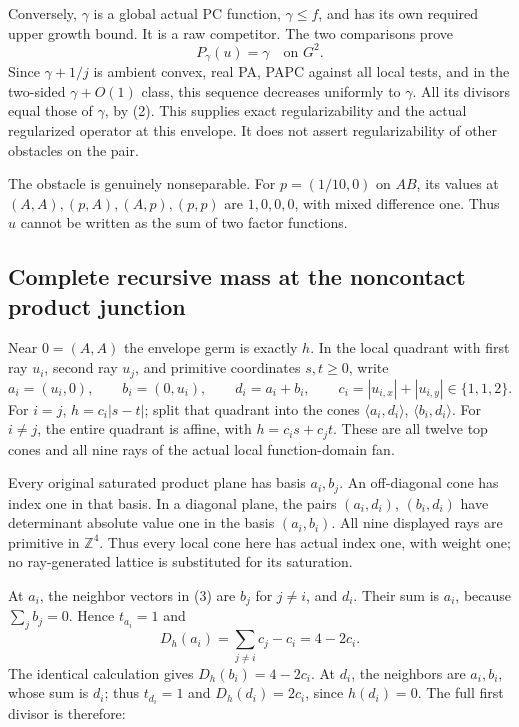 \documentclass[
  10pt,
]{article}
\begin{document}
Conversely, \(\gamma\) is a global actual PC function, \(\gamma\leq f\),
and has its own required upper growth bound. It is a raw competitor. The
two comparisons prove \[
                              P_\gamma(u)=\gamma\quad\text{on }G^2.
 \tag{10}
\] Since \(\gamma+1/j\) is ambient convex, real PA, PAPC against all
local tests, and in the two-sided \(\gamma+O(1)\) class, this sequence
decreases uniformly to \(\gamma\). All its divisors equal those of
\(\gamma\), by (2). This supplies exact regularizability and the actual
regularized operator at this envelope. It does not assert
regularizability of other obstacles on the pair.

The obstacle is genuinely nonseparable. For \(p=(1/10,0)\) on \(AB\),
its values at \((A,A),(p,A),(A,p),(p,p)\) are \(1,0,0,0\), with mixed
difference one. Thus \(u\) cannot be written as the sum of two factor
functions.

\subsection{Complete recursive mass at the noncontact product
junction}\label{complete-recursive-mass-at-the-noncontact-product-junction}

Near \(0=(A,A)\) the envelope germ is exactly \(h\). In the local
quadrant with first ray \(u_i\), second ray \(u_j\), and primitive
coordinates \(s,t\geq0\), write \[
 a_i=(u_i,0),\qquad b_i=(0,u_i),\qquad d_i=a_i+b_i,
 \qquad c_i=|u_{i,x}|+|u_{i,y}|\in\{1,1,2\}.
\] For \(i=j\), \(h=c_i|s-t|\); split that quadrant into the cones
\(\langle a_i,d_i\rangle\), \(\langle b_i,d_i\rangle\). For \(i\ne j\),
the entire quadrant is affine, with \(h=c_is+c_jt\). These are all
twelve top cones and all nine rays of the actual local function-domain
fan.

Every original saturated product plane has basis \(a_i,b_j\). An
off-diagonal cone has index one in that basis. In a diagonal plane, the
pairs \((a_i,d_i)\), \((b_i,d_i)\) have determinant absolute value one
in the basis \((a_i,b_i)\). All nine displayed rays are primitive in
\(\mathbb{Z}^4\). Thus every local cone here has actual index one, with
weight one; no ray-generated lattice is substituted for its saturation.

At \(a_i\), the neighbor vectors in (3) are \(b_j\) for \(j\ne i\), and
\(d_i\). Their sum is \(a_i\), because \(\sum_jb_j=0\). Hence
\(t_{a_i}=1\) and \[
 D_h(a_i)=\sum_{j\ne i}c_j-c_i=4-2c_i.
\] The identical calculation gives \(D_h(b_i)=4-2c_i\). At \(d_i\), the
neighbors are \(a_i,b_i\), whose sum is \(d_i\); thus \(t_{d_i}=1\) and
\(D_h(d_i)=2c_i\), since \(h(d_i)=0\). The full first divisor is
therefore:
\end{document}
